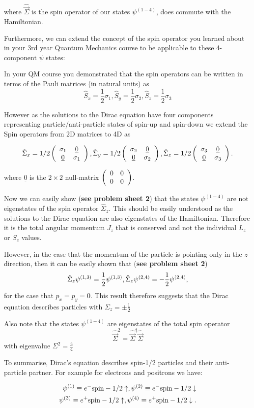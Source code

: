 where $\hat{\vec{\Sigma}}$ is the spin operator of our states $\psi^{(1-4)}$, does commute with the Hamiltonian. 

Furthermore, we can extend the concept of the spin operator you learned about in your 3rd year Quantum Mechanics course to be applicable to these 4-component $\psi$ states:

In your QM course you demonstrated that the spin operators can be written in terms of the Pauli matrices (in natural units) as 
\[
\hat{S}_x=\frac{1}{2}\sigma_1,\hat{S}_y=\frac{1}{2}\sigma_2,\hat{S}_z=\frac{1}{2}\sigma_3
\]

However as the solutions to the Dirac equation have four components representing particle/anti-particle states of spin-up and spin-down we extend the Spin operators from 2D matrices to 4D as


\[ \hat{\Sigma}_{x} =1/2
 \left( \begin{array}{cc} \sigma_{1} & \underline{0} \\ \underline{0} & \sigma_{1} \end{array} \right) ,
\hat{\Sigma}_{y} =1/2
 \left( \begin{array}{cc} \sigma_{2} & \underline{0} \\ \underline{0} & \sigma_{2} \end{array} \right) ,
\hat{\Sigma}_{z} =1/2
 \left( \begin{array}{cc} \sigma_{3} & \underline{0} \\ \underline{0} & \sigma_{3} \end{array} \right).
\]

where $\underline{0}$ is the $2\times2$ null-matrix 
$ \left( \begin{array}{cc} 0 & 0 \\ 0 & 0 \end{array} \right)$.

Now we can easily show ({\bf see problem sheet 2}) that the states $\psi^{(1-4)}$ are not eigenstates of the spin operator $\hat{\Sigma}_{z}$. This should be easily understood as the solutions to the Dirac equation are also eigenstates of the Hamiltonian. Therefore it is the total angular momentum $J_z$ that is conserved and not the individual $L_z$ or $S_z$ values.

However, in the case that the momentum of the particle is pointing only in the $z$-direction, then 
it can be easily shown that ({\bf see problem sheet 2})
\[
\hat{\Sigma}_{z}\psi^{(1,3)}=\frac{1}{2}\psi^{(1,3)},\\
\hat{\Sigma}_{z}\psi^{(2,4)}=-\frac{1}{2}\psi^{(2,4)},
\]
for the case that $p_x=p_y=0$. This result therefore suggests that the Dirac equation describes particles with $\Sigma_{z}=\pm\frac{1}{2}$

Also note that the states  $\psi^{(1-4)}$ are eigenstates of the total spin operator
\[
\hat{\vec{\Sigma}}^2=\hat{\vec{\Sigma}}^{\dagger}\hat{\vec{\Sigma}}
\]
with eigenvalue $\Sigma^2=\frac{3}{4}$


To summarise, Dirac's equation describes spin-1/2 particles and their anti-particle partner. For example for electrons and positrons we have:

\begin{eqnarray*}
\psi^{(1)}\equiv e^- {\rm spin}-1/2 \uparrow,
\psi^{(2)}\equiv e^- {\rm spin}-1/2 \downarrow\\
\psi^{(3)}\equiv e^+ {\rm spin}-1/2 \uparrow, \psi^{(4)}\equiv e^+ {\rm spin}-1/2 \downarrow.
\end{eqnarray*}
